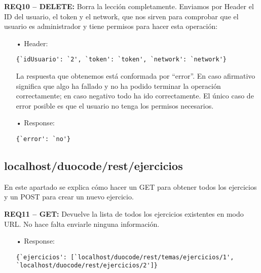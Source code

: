 \textbf{REQ10 – DELETE:} Borra la lección completamente. Enviamos por Header el ID del usuario, el token y el network, que nos sirven para comprobar que el usuario es administrador y tiene permisos para hacer esta operación:
\begin{itemize}
\item[•]
Header: 
{\codesize
\begin{verbatim}
{`idUsuario': `2', `token': `token', `network': `network'}
\end{verbatim}
}

La respuesta que obtenemos está conformada por ``error''. En caso afirmativo significa que algo ha fallado y no ha podido terminar la operación correctamente; en caso negativo todo ha ido correctamente. El único caso de error posible es que el usuario no tenga los permisos necesarios.
\item[•] 
Response:
{\codesize
\begin{verbatim} 
{`error': `no'}
\end{verbatim}
}
\end{itemize}

\subsection{localhost/duocode/rest/ejercicios}
En este apartado se explica cómo hacer un GET para obtener todos los ejercicios y un POST para crear un nuevo ejercicio.

\textbf{REQ11 – GET:} Devuelve la lista de todos los ejercicios existentes en modo URL. No hace falta enviarle ninguna información. 
\begin{itemize}
\item[•]
Response: 
{\codesize
\begin{verbatim}
{`ejercicios': [`localhost/duocode/rest/temas/ejercicios/1', 
`localhost/duocode/rest/ejercicios/2']}
\end{verbatim}
}
\end{itemize}

